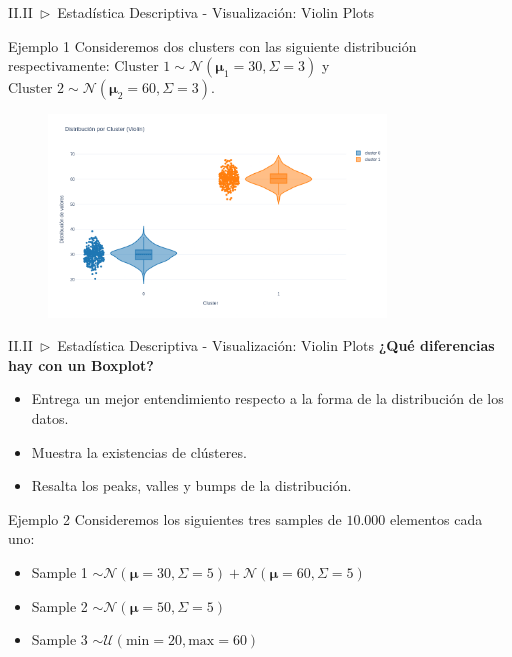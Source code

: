 \documentclass[xcolor=dvipsnames]{beamer}
\begin{document}
    \begin{frame}{II.II~$\rhd$~Estadística Descriptiva - Visualización: Violin Plots}
        \begin{exampleblock}{Ejemplo 1}
        Consideremos dos clusters con las siguiente distribución respectivamente: $\text{Cluster 1} \sim \mathcal{N}(\boldsymbol{\mu}_1=30, \Sigma=3)$ y $\text{Cluster 2} \sim \mathcal{N}(\boldsymbol{\mu}_2=60, \Sigma=3)$.
        \end{exampleblock}
        \begin{figure}
            \centering
            \includegraphics[width=0.8\textwidth]{imgs/violin/ej_03.png}
        \end{figure}
    \end{frame}

    \begin{frame}{II.II~$\rhd$~Estadística Descriptiva - Visualización: Violin Plots}
        \textbf{¿Qué diferencias hay con un Boxplot?}
        \vspace{5mm}
        \begin{itemize}
            \item Entrega un mejor entendimiento respecto a la forma de la distribución de los datos.%
            \item Muestra la existencias de clústeres.
            \item Resalta los peaks, valles y bumps de la distribución.
        \end{itemize}
        \vspace{5mm}%
        \begin{exampleblock}{Ejemplo 2}
        Consideremos los siguientes tres samples de $10.000$ elementos cada uno:
        \begin{itemize}
            \item Sample 1 $\sim \mathcal{N}(\boldsymbol{\mu}=30, \Sigma=5) + \mathcal{N}(\boldsymbol{\mu}=60, \Sigma=5)$
            \item Sample 2 $\sim \mathcal{N}(\boldsymbol{\mu}=50, \Sigma=5)$
            \item Sample 3 $\sim \mathcal{U}(\text{min}=20, \text{max}=60)$
        \end{itemize}
        \end{exampleblock}
    \end{frame}
\end{document}
